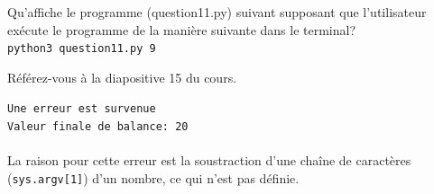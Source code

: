  \begin{Exercice}[5 minutes]
   Qu'affiche le programme (question11.py) suivant supposant que l'utilisateur exécute le programme de la manière suivante dans le terminal? \\ \newline 
   \texttt{python3 question11.py 9} \\ 
   \begin{conseil}
   Référez-vous à la diapositive 15 du cours.
   \end{conseil}
   
   \begin{solution}
   
\texttt{Une erreur est survenue \\
Valeur finale de balance: 20
    } \\ \\
    La raison pour cette erreur est la soustraction d'une chaîne de caractères (\texttt{sys.argv[1]}) d'un nombre, ce qui n'est pas définie. 
   \end{solution}
 \end{Exercice}

